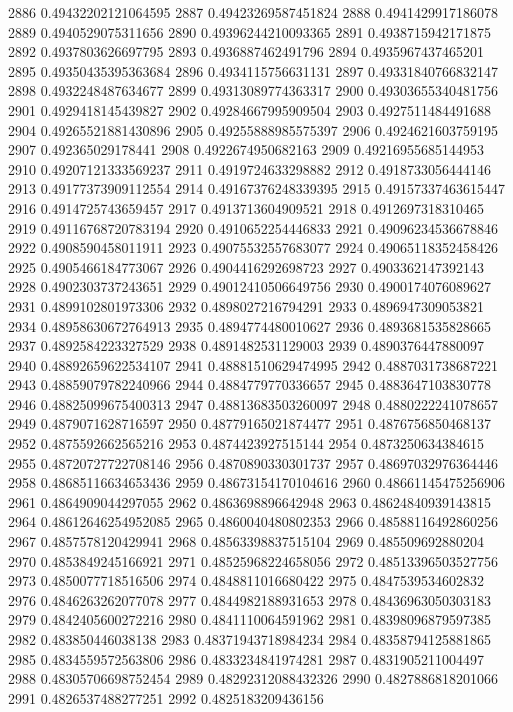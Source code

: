 2886 0.49432202121064595
2887 0.49423269587451824
2888 0.4941429917186078
2889 0.4940529075311656
2890 0.49396244210093365
2891 0.4938715942171875
2892 0.4937803626697795
2893 0.4936887462491796
2894 0.4935967437465201
2895 0.49350435395363684
2896 0.4934115756631131
2897 0.49331840766832147
2898 0.4932248487634677
2899 0.49313089774363317
2900 0.49303655340481756
2901 0.4929418145439827
2902 0.49284667995909504
2903 0.4927511484491688
2904 0.49265521881430896
2905 0.49255888985575397
2906 0.4924621603759195
2907 0.492365029178441
2908 0.4922674950682163
2909 0.49216955685144953
2910 0.49207121333569237
2911 0.4919724633298882
2912 0.4918733056444146
2913 0.49177373909112554
2914 0.49167376248339395
2915 0.49157337463615447
2916 0.4914725743659457
2917 0.4913713604909521
2918 0.4912697318310465
2919 0.49116768720783194
2920 0.4910652254446833
2921 0.49096234536678846
2922 0.4908590458011911
2923 0.49075532557683077
2924 0.49065118352458426
2925 0.4905466184773067
2926 0.4904416292698723
2927 0.4903362147392143
2928 0.4902303737243651
2929 0.49012410506649756
2930 0.4900174076089627
2931 0.4899102801973306
2932 0.4898027216794291
2933 0.4896947309053821
2934 0.48958630672764913
2935 0.4894774480010627
2936 0.4893681535828665
2937 0.4892584223327529
2938 0.4891482531129003
2939 0.4890376447880097
2940 0.48892659622534107
2941 0.48881510629474995
2942 0.4887031738687221
2943 0.48859079782240966
2944 0.4884779770336657
2945 0.4883647103830778
2946 0.48825099675400313
2947 0.48813683503260097
2948 0.4880222241078657
2949 0.4879071628716597
2950 0.48779165021874477
2951 0.4876756850468137
2952 0.4875592662565216
2953 0.4874423927515144
2954 0.4873250634384615
2955 0.48720727722708146
2956 0.4870890330301737
2957 0.48697032976364446
2958 0.48685116634653436
2959 0.48673154170104616
2960 0.48661145475256906
2961 0.4864909044297055
2962 0.4863698896642948
2963 0.48624840939143815
2964 0.48612646254952085
2965 0.4860040480802353
2966 0.48588116492860256
2967 0.4857578120429941
2968 0.48563398837515104
2969 0.485509692880204
2970 0.4853849245166921
2971 0.48525968224658056
2972 0.48513396503527756
2973 0.4850077718516506
2974 0.4848811016680422
2975 0.4847539534602832
2976 0.4846263262077078
2977 0.4844982188931653
2978 0.48436963050303183
2979 0.4842405600272216
2980 0.4841110064591962
2981 0.48398096879597385
2982 0.483850446038138
2983 0.48371943718984234
2984 0.48358794125881865
2985 0.4834559572563806
2986 0.4833234841974281
2987 0.4831905211004497
2988 0.48305706698752454
2989 0.48292312088432326
2990 0.4827886818201066
2991 0.4826537488277251
2992 0.4825183209436156
